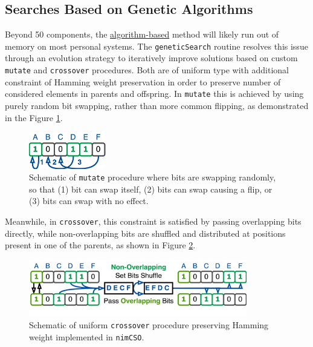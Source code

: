 \subsection{Searches Based on Genetic Algorithms} \label{nimcso:ssec:geneticsearches}

Beyond 50 components, the
\protect\hyperlink{algorithm-based-search}{algorithm-based} method will
likely run out of memory on most personal systems. The
\texttt{geneticSearch} routine resolves this issue through an evolution
strategy to iteratively improve solutions based on custom
\texttt{mutate} and \texttt{crossover} procedures. Both are of uniform
type \cite{Goldberg1989} with
additional constraint of Hamming weight
\cite{Knuth} preservation in order to
preserve number of considered elements in parents and offspring. In
\texttt{mutate} this is achieved by using purely random bit swapping,
rather than more common flipping, as demonstrated in the Figure
\ref{nimcso:fig:mutate}.

\begin{figure}[H]
  \centering
  \includegraphics[width=0.3\textwidth]{nimcso/nimcso_mutate.drawio.png}
  \caption{Schematic of \texttt{mutate} procedure where bits are swapping
  randomly, so that (1) bit can swap itself, (2) bits can swap causing a
  flip, or (3) bits can swap with no effect.}
  \label{nimcso:fig:mutate}
\end{figure}

Meanwhile, in \texttt{crossover}, this constraint is satisfied by
passing overlapping bits directly, while non-overlapping bits are
shuffled and distributed at positions present in one of the parents, as
shown in Figure \ref{nimcso:fig:crossover}.

\begin{figure}[H]
\centering
\includegraphics[width=0.85\textwidth]{nimcso/nimcso_crossover.drawio.png}
\caption{Schematic of uniform \texttt{crossover} procedure preserving
Hamming weight implemented in \texttt{nimCSO}.}
\label{nimcso:fig:crossover}
\end{figure}

